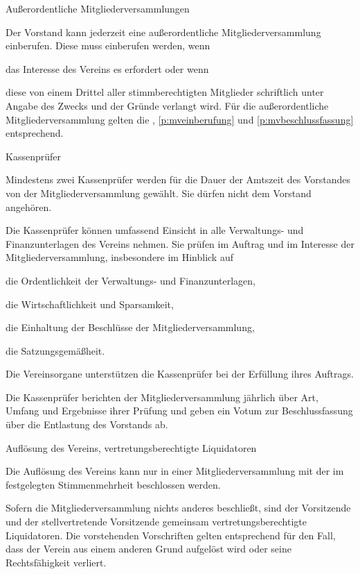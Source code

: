 \documentclass[11pt,a4paper,twoside,openany,article]{memoir}
\begin{document}
\begin{para}{Außerordentliche Mitgliederversammlungen}
  \label{p:mvaußerordentlich}
  \item Der Vorstand kann jederzeit eine außerordentliche Mitgliederversammlung einberufen. Diese muss einberufen werden, wenn
  \begin{subpara}
    \item das Interesse des Vereins es erfordert oder wenn
    \item diese von einem Drittel aller stimmberechtigten Mitglieder schriftlich unter Angabe des Zwecks und der Gründe verlangt wird.
    Für die außerordentliche Mitgliederversammlung gelten die , \ref{p:mveinberufung} und \ref{p:mvbeschlussfassung} entsprechend.
  \end{subpara}
\end{para}

\begin{para}{Kassenprüfer}
  \label{p:kassenprüfer}
  \item Mindestens zwei Kassenprüfer werden für die Dauer der Amtszeit des Vorstandes von der Mitgliederversammlung gewählt. Sie dürfen nicht dem Vorstand angehören.
  \item Die Kassenprüfer können umfassend Einsicht in alle Verwaltungs- und Finanzunterlagen des Vereins nehmen. Sie prüfen im Auftrag und im Interesse der Mitgliederversammlung, insbesondere im Hinblick auf
  \begin{subpara}
    \item die Ordentlichkeit der Verwaltungs- und Finanzunterlagen,
    \item die Wirtschaftlichkeit und Sparsamkeit,
    \item die Einhaltung der Beschlüsse der Mitgliederversammlung,
    \item die Satzungsgemäßheit.
  \end{subpara}
  \item Die Vereinsorgane unterstützen die Kassenprüfer bei der Erfüllung ihres Auftrags.
  \item Die Kassenprüfer berichten der Mitgliederversammlung jährlich über Art, Umfang und Ergebnisse ihrer Prüfung und geben ein Votum zur Beschlussfassung über die Entlastung des Vorstands ab.
\end{para}

\begin{para}{Auflösung des Vereins, vertretungsberechtigte Liquidatoren}
  \label{p:auflösung}
  \item Die Auflösung des Vereins kann nur in einer Mitgliederversammlung mit der im  festgelegten Stimmenmehrheit beschlossen werden.
  \item Sofern die Mitgliederversammlung nichts anderes beschließt, sind der Vorsitzende und der stellvertretende Vorsitzende gemeinsam vertretungs\-be\-rech\-tigte Liquidatoren.
  Die vorstehenden Vorschriften gelten entsprechend für den Fall, dass der Verein aus einem anderen Grund aufgelöst wird oder seine Rechtsfähigkeit verliert.
\end{para}
\end{document}
